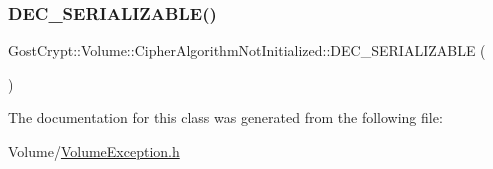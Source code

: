 \subsubsection{\texorpdfstring{D\+E\+C\+\_\+\+S\+E\+R\+I\+A\+L\+I\+Z\+A\+B\+L\+E()}{DEC\_SERIALIZABLE()}}
{\footnotesize\ttfamily Gost\+Crypt\+::\+Volume\+::\+Cipher\+Algorithm\+Not\+Initialized\+::\+D\+E\+C\+\_\+\+S\+E\+R\+I\+A\+L\+I\+Z\+A\+B\+LE (\begin{DoxyParamCaption}\item[{\hyperlink{class_gost_crypt_1_1_volume_1_1_cipher_algorithm_not_initialized}{Cipher\+Algorithm\+Not\+Initialized}}]{ }\end{DoxyParamCaption})}



The documentation for this class was generated from the following file\+:\begin{DoxyCompactItemize}
\item 
Volume/\hyperlink{_volume_exception_8h}{Volume\+Exception.\+h}\end{DoxyCompactItemize}
